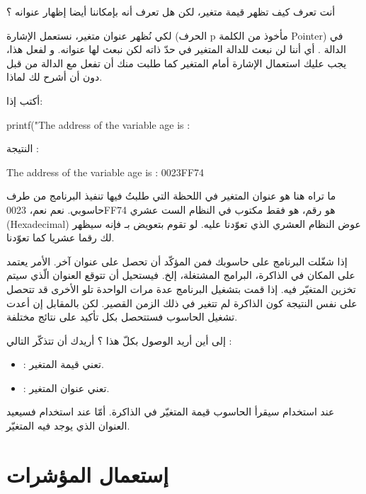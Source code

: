 أنت تعرف كيف تظهر قيمة متغير، لكن هل تعرف أنه بإمكاننا أيضا إظهار عنوانه ؟

لكي نُظهر عنوان متغير، نستعمل الإشارة
(الحرف
\textenglish{p}
مأخوذ من الكلمة
\textenglish{Pointer})
في الدالة
.
أي أننا لن نبعث للدالة
المتغير في حدّ ذاته لكن نبعث لها عنوانه. و لفعل هذا، يجب عليك استعمال الإشارة
\InlineCode{\&}
أمام المتغير
كما طلبت منك أن تفعل مع الدالة
من قبل دون أن أشرح لك لماذا.

أكتب إذا:

\begin{Csource}
printf("The address of the variable age is  : %
\end{Csource}
النتيجة :

\begin{Console}
The address of the variable age is : 0023FF74
\end{Console}

ما تراه هنا هو عنوان المتغير
في اللحظة التي طلبتُ فيها تنفيذ البرنامج من طرف حاسوبي. نعم نعم،
0023FF74
هو رقم، هو فقط مكتوب في النظام الست عشري
(\textenglish{Hexadecimal})
عوض النظام العشري الذي تعوّدنا عليه. لو تقوم بتعويض
بـ
فإنه سيظهر لك رقما عشريا كما تعوّدنا.

\begin{information}
	إذا شغّلت البرنامج على حاسوبك فمن المؤكّد أن تحصل على عنوان آخر. الأمر يعتمد على المكان في الذاكرة، البرامج المشتغلة، إلخ.
فيستحيل أن تتوقع العنوان الّذي سيتم تخزين المتغيّر فيه.
إذا قمت بتشغيل البرنامج عدة مرات الواحدة تلو الأخرى قد تتحصل على نفس النتيجة كون الذاكرة لم تتغير في ذلك الزمن القصير.
لكن بالمقابل إن أعدت تشغيل الحاسوب فستتحصل بكل تأكيد على نتائج مختلفة.
\end{information}

إلى أين أريد الوصول بكلّ هذا ؟ أريدك أن تتذكّر التالي :

\begin{itemize}
	\item {} : تعني قيمة المتغير.
	\item {} : تعني عنوان المتغير.
\end{itemize}

عند استخدام
سيقرأ الحاسوب قيمة المتغيّر في الذاكرة. أمّا عند استخدام
فسيعيد العنوان الذي يوجد فيه المتغيّر.

\section{إستعمال المؤشرات}


